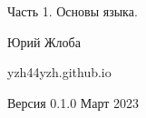 
\begin{titlepage}

\centering


\vspace{20pt}

\huge{Часть 1. Основы языка.}

\vspace{20pt}

\large{Юрий Жлоба}

\vfill

\small{yzh44yzh.github.io}

\vspace{20pt}

\small{Версия 0.1.0 Март 2023}

\end{titlepage}

\ClearShipoutPictureBG

